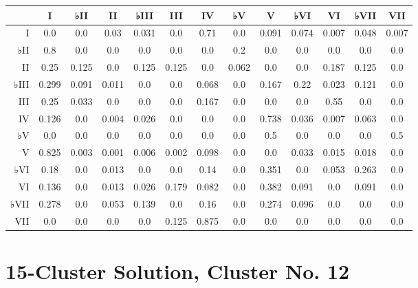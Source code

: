 \begin{table}[htbp]
\begin{minipage}{\linewidth}
\setlength{\tymax}{0.5\linewidth}
\centering
\small
\begin{tabulary}{\textwidth}{@{}RCCCCCCCCCCCC@{}} \toprule
&I&♭II&II&♭III&III&IV&♭V&V&♭VI&VI&♭VII&VII\\
\midrule
I&0.0&0.0&0.03&0.031&0.0&0.71&0.0&0.091&0.074&0.007&0.048&0.007\\
♭II&0.8&0.0&0.0&0.0&0.0&0.0&0.2&0.0&0.0&0.0&0.0&0.0\\
II&0.25&0.125&0.0&0.125&0.125&0.0&0.062&0.0&0.0&0.187&0.125&0.0\\
♭III&0.299&0.091&0.011&0.0&0.0&0.068&0.0&0.167&0.22&0.023&0.121&0.0\\
III&0.25&0.033&0.0&0.0&0.0&0.167&0.0&0.0&0.0&0.55&0.0&0.0\\
IV&0.126&0.0&0.004&0.026&0.0&0.0&0.0&0.738&0.036&0.007&0.063&0.0\\
♭V&0.0&0.0&0.0&0.0&0.0&0.0&0.0&0.5&0.0&0.0&0.0&0.5\\
V&0.825&0.003&0.001&0.006&0.002&0.098&0.0&0.0&0.033&0.015&0.018&0.0\\
♭VI&0.18&0.0&0.013&0.0&0.0&0.14&0.0&0.351&0.0&0.053&0.263&0.0\\
VI&0.136&0.0&0.013&0.026&0.179&0.082&0.0&0.382&0.091&0.0&0.091&0.0\\
♭VII&0.278&0.0&0.053&0.139&0.0&0.16&0.0&0.274&0.096&0.0&0.0&0.0\\
VII&0.0&0.0&0.0&0.0&0.125&0.875&0.0&0.0&0.0&0.0&0.0&0.0\\

\bottomrule

\end{tabulary}
\end{minipage}
\end{table}

\section{15-Cluster Solution, Cluster No. 12}
\label{15-clustersolutionclusterno.12}


